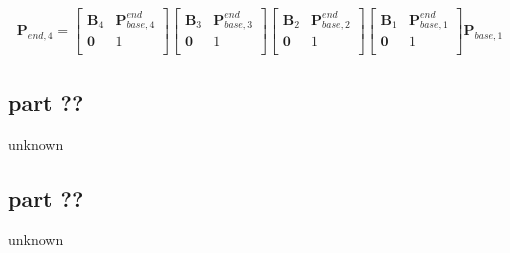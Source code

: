 \begin{align}
    \textbf{P}_{end,4}
    =
    \begin{bmatrix}
        \textbf{B}_4 & \textbf{P}_{base,4}^{end} \\
        \textbf{0} & 1 \\
    \end{bmatrix}
    \begin{bmatrix}
        \textbf{B}_3 & \textbf{P}_{base,3}^{end} \\
        \textbf{0} & 1 \\
    \end{bmatrix}
    \begin{bmatrix}
        \textbf{B}_2 & \textbf{P}_{base,2}^{end} \\
        \textbf{0} & 1 \\
    \end{bmatrix}
    \begin{bmatrix}
        \textbf{B}_1 & \textbf{P}_{base,1}^{end} \\
        \textbf{0} & 1 \\
    \end{bmatrix}
    \textbf{P}_{base,1}
    \label{eq:FMplus4}
\end{align}

\subsection{part ??}
unknown
\subsection{part ??}
unknown

\newpage